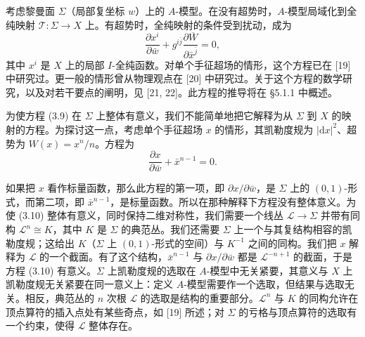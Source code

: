 \documentclass[11pt,a4paper,UTF8]{ctexart}
\theoremstyle{plain}
\theoremstyle{definition}
\begin{document}
考虑黎曼面 $\Sigma$（局部复坐标 $w$）上的 $A$-模型。在没有超势时，$A$-模型局域化到全纯映射 $\mathcal{T}:\Sigma\to X$ 上。有超势时，全纯映射的条件受到扰动，成为
\begin{equation}
    \frac{\partial x^i}{\partial\bar w}+g^{i\bar j}\frac{\partial\overline{W}}{\partial\bar x^{\bar j}}=0,
    \tag{3.9}
\end{equation}
其中 $x^i$ 是 $X$ 上的局部 $I$-全纯函数。对单个手征超场的情形，这个方程已在 [19] 中研究过。更一般的情形曾从物理观点在 [20] 中研究过。关于这个方程的数学研究，以及对若干要点的阐明，见 [21, 22]。此方程的推导将在 §5.1.1 中概述。


为使方程 (3.9) 在 $\Sigma$ 上整体有意义，我们不能简单地把它解释为从 $\Sigma$ 到 $X$ 的映射的方程。为探讨这一点，考虑单个手征超场 $x$ 的情形，其凯勒度规为 $|\mathrm{d}x|^2$、超势为 $W(x)=x^n/n$。方程为
\begin{equation}
    \frac{\partial x}{\partial\bar w}+\bar x^{n-1}=0.
    \tag{3.10}
\end{equation}

如果把 $x$ 看作标量函数，那么此方程的第一项，即 $\partial x/\partial\bar w$，是 $\Sigma$ 上的 $(0,1)$-形式，而第二项，即 $\bar x^{n-1}$，是标量函数。所以在那种解释下方程没有整体意义。为使 (3.10) 整体有意义，同时保持二维对称性，我们需要一个线丛 $\mathcal{L}\to\Sigma$ 并带有同构 $\mathcal{L}^n\cong K$，其中 $K$ 是 $\Sigma$ 的典范丛。我们还需要 $\Sigma$ 上一个与其复结构相容的凯勒度规；这给出 $K$（$\Sigma$ 上 $(0,1)$-形式的空间）与 $K^{-1}$ 之间的同构。我们把 $x$ 解释为 $\mathcal{L}$ 的一个截面。有了这个结构，$\bar x^{n-1}$ 与 $\partial x/\partial\bar w$ 都是 $\mathcal{L}^{-n+1}$ 的截面，于是方程 (3.10) 有意义。$\Sigma$ 上凯勒度规的选取在 $A$-模型中无关紧要，其意义与 $X$ 上凯勒度规无关紧要在同一意义上：定义 $A$-模型需要作一个选取，但结果与选取无关。相反，典范丛的 $n$ 次根 $\mathcal{L}$ 的选取是结构的重要部分。$\mathcal{L}^n$ 与 $K$ 的同构允许在顶点算符的插入点处有某些奇点，如 [19] 所述；对 $\Sigma$ 的亏格与顶点算符的选取有一个约束，使得 $\mathcal{L}$ 整体存在。
\end{document}
